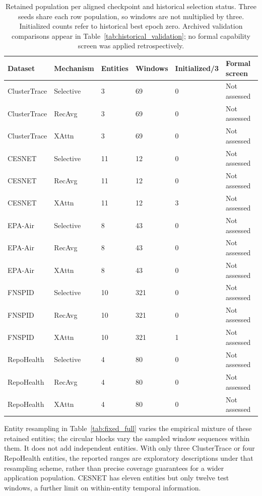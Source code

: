 \begin{table}[htbp]
\centering\small
\caption{Retained population per aligned checkpoint and historical selection status. Three seeds share each row population, so windows are not multiplied by three. Initialized counts refer to historical best epoch zero. Archived validation comparisons appear in Table~\ref{tab:historical_validation}; no formal capability screen was applied retrospectively.}
\label{tab:fixed_population}
\begin{tabular}{llllll}
\toprule
Dataset & Mechanism & Entities & Windows & Initialized/3 & Formal screen\\
\midrule
ClusterTrace & Selective & 3 & 69 & 0 & Not assessed\\
ClusterTrace & RecAvg & 3 & 69 & 0 & Not assessed\\
ClusterTrace & XAttn & 3 & 69 & 0 & Not assessed\\
CESNET & Selective & 11 & 12 & 0 & Not assessed\\
CESNET & RecAvg & 11 & 12 & 0 & Not assessed\\
CESNET & XAttn & 11 & 12 & 3 & Not assessed\\
EPA-Air & Selective & 8 & 43 & 0 & Not assessed\\
EPA-Air & RecAvg & 8 & 43 & 0 & Not assessed\\
EPA-Air & XAttn & 8 & 43 & 0 & Not assessed\\
FNSPID & Selective & 10 & 321 & 0 & Not assessed\\
FNSPID & RecAvg & 10 & 321 & 0 & Not assessed\\
FNSPID & XAttn & 10 & 321 & 1 & Not assessed\\
RepoHealth & Selective & 4 & 80 & 0 & Not assessed\\
RepoHealth & RecAvg & 4 & 80 & 0 & Not assessed\\
RepoHealth & XAttn & 4 & 80 & 0 & Not assessed\\
\bottomrule
\end{tabular}
\end{table}

Entity resampling in Table~\ref{tab:fixed_full} varies the empirical mixture of these retained entities; the circular blocks vary the sampled window sequences within them. It does not add independent entities. With only three ClusterTrace or four RepoHealth entities, the reported ranges are exploratory descriptions under that resampling scheme, rather than precise coverage guarantees for a wider application population. CESNET has eleven entities but only twelve test windows, a further limit on within-entity temporal information.
